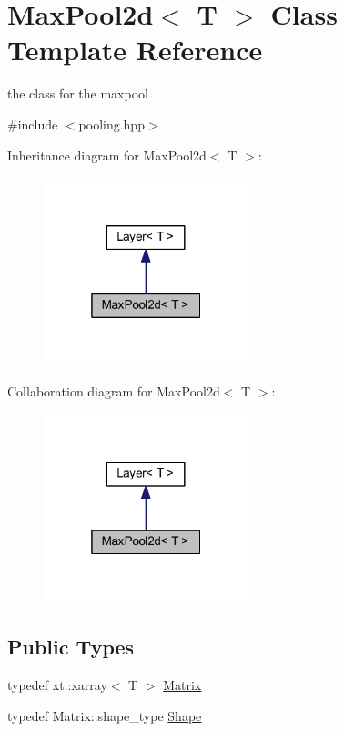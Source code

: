 \hypertarget{class_max_pool2d}{}\section{Max\+Pool2d$<$ T $>$ Class Template Reference}
\label{class_max_pool2d}


the class for the maxpool  




{\ttfamily \#include $<$pooling.\+hpp$>$}



Inheritance diagram for Max\+Pool2d$<$ T $>$\+:\nopagebreak
\begin{figure}[H]
\begin{center}
\leavevmode
\includegraphics[width=169pt]{class_max_pool2d__inherit__graph}
\end{center}
\end{figure}


Collaboration diagram for Max\+Pool2d$<$ T $>$\+:\nopagebreak
\begin{figure}[H]
\begin{center}
\leavevmode
\includegraphics[width=169pt]{class_max_pool2d__coll__graph}
\end{center}
\end{figure}
\subsection*{Public Types}
\begin{DoxyCompactItemize}
\item 
typedef xt\+::xarray$<$ T $>$ \mbox{\hyperlink{class_max_pool2d_a8e701daf0dfb0e61e36eec865297a4e9}{Matrix}}
\item 
typedef Matrix\+::shape\+\_\+type \mbox{\hyperlink{class_max_pool2d_ad70f776b32f3a19af78573b634d00072}{Shape}}
\end{DoxyCompactItemize}
